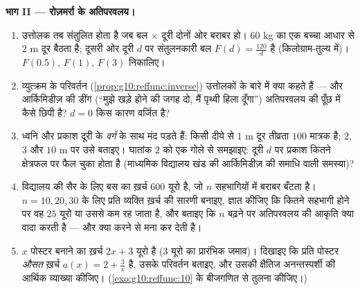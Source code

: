 \begin{problem}
\medskip
\noindent\textbf{भाग II --- रोज़मर्रा के अतिपरवलय।}
\begin{enumerate}[resume]
  \item उत्तोलक तब संतुलित होता है जब बल $\times$ दूरी दोनों ओर बराबर हो।
        $60$ kg का एक बच्चा आधार से $2$ m दूर बैठता है; दूसरी ओर दूरी
        $d$ पर संतुलनकारी बल $F(d) = \frac{120}{d}$ है (किलोग्राम-तुल्य में)। $F(0.5)$, $F(1)$,
        $F(3)$ निकालिए।
  \item व्युत्क्रम  के परिवर्तन (\cref{prop:g10:reffunc:inverse}) उत्तोलकों के बारे में क्या
        कहते हैं --- और आर्किमिडीज़ की डींग (``मुझे खड़े होने की जगह दो,
        मैं पृथ्वी हिला दूँगा'') अतिपरवलय की पूँछ में कैसे छिपी है? $d = 0$
        किस कारण वर्जित है?
  \item ध्वनि और प्रकाश दूरी के \emph{वर्ग} के साथ मंद पड़ते हैं: किसी
        दीये से $1$ m दूर तीव्रता $100$ मात्रक है; $2$, $3$ और $10$
        m पर उसे बताइए। घातांक $2$ को एक गोले से समझाइए: दूरी $d$ पर
        प्रकाश कितने क्षेत्रफल पर फैल चुका होता है (माध्यमिक विद्यालय खंड
        की आर्किमिडीज़ की समाधि वाली समस्या)?
  \item विद्यालय की सैर के लिए बस का ख़र्च $600$ यूरो है, जो $n$
        सहभागियों में बराबर बँटता है। $n = 10, 20, 30$ के लिए प्रति व्यक्ति ख़र्च की
        सारणी बनाइए, ज्ञात कीजिए कि कितने सहभागी होने पर वह $25$ यूरो या
        उससे कम रह जाता है, और बताइए कि $n$ बढ़ने पर अतिपरवलय की आकृति
        क्या वादा करती है --- और क्या करने से मना कर देती है।
  \item $x$ पोस्टर बनाने का ख़र्च $2x + 3$ यूरो है ($3$ यूरो का प्रारंभिक
        जमाव)। दिखाइए कि प्रति पोस्टर \emph{औसत} ख़र्च $a(x) = 2 + \frac3x$ है, उसके
        परिवर्तन बताइए, और उसकी क्षैतिज अनन्तस्पर्शी की आर्थिक व्याख्या
        कीजिए। (\cref{exo:g10:reffunc:10} के बीजगणित से तुलना कीजिए।)
\end{enumerate}


\end{problem}
